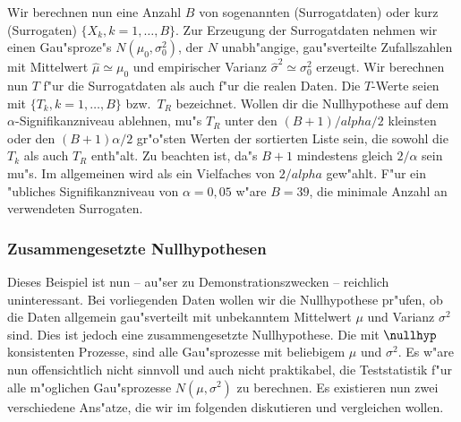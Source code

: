 Wir berechnen nun eine Anzahl $B$ von sogenannten \begriff(Surrogatdaten) oder kurz
\begriff(Surrogaten) $\{X_k, k=1,\dots,B\}$. Zur Erzeugung der Surrogatdaten nehmen wir
einen Gau"sproze"s $N(\mu_0,\sigma_0^2)$, der $N$ unabh"angige, gau"sverteilte Zufallszahlen mit
Mittelwert $\hat\mu\simeq \mu_0$ und empirischer Varianz $\hat\sigma^2\simeq \sigma_0^2$
erzeugt\footnotemark. Wir berechnen nun $T$ f"ur die Surrogatdaten als auch f"ur die
realen Daten. Die $T$-Werte seien mit $\{T_k,k=1,\dots,B\}$ bzw.\ $T_R$ bezeichnet. Wollen
dir die Nullhypothese auf dem $\alpha$-Signifikanzniveau ablehnen, mu"s $T_R$ unter den
$(B+1)/alpha/2$ kleinsten oder den $(B+1)\alpha/2$ gr"o"sten Werten der sortierten Liste
sein, die sowohl die $T_k$ als auch $T_R$ enth"alt\footnotemark. Zu beachten ist, da"s
$B+1$ mindestens gleich $2/\alpha$ sein mu"s. Im allgemeinen wird als ein Vielfaches von
$2/alpha$ gew"ahlt. F"ur ein "ubliches Signifikanzniveau von $\alpha=0,05$ w"are $B=39$,
die minimale Anzahl an verwendeten Surrogaten.    

\subsubsection{Zusammengesetzte Nullhypothesen}
Dieses Beispiel ist nun -- au"ser zu Demonstrationszwecken -- reichlich uninteressant. Bei
vorliegenden Daten wollen wir die Nullhypothese pr"ufen, ob die Daten allgemein
gau"sverteilt mit unbekanntem Mittelwert $\mu$ und Varianz $\sigma^2$ sind. Dies ist
jedoch eine zusammengesetzte Nullhypothese. Die mit $\nullhyp$ konsistenten Prozesse, sind
alle Gau"sprozesse mit beliebigem $\mu$ und $\sigma^2$. Es w"are nun offensichtlich nicht
sinnvoll und auch nicht praktikabel, die Teststatistik  f"ur alle
m"oglichen Gau"sprozesse $N(\mu,\sigma^2)$ zu berechnen. Es existieren nun zwei verschiedene
Ans"atze, die wir im folgenden diskutieren und vergleichen wollen.

